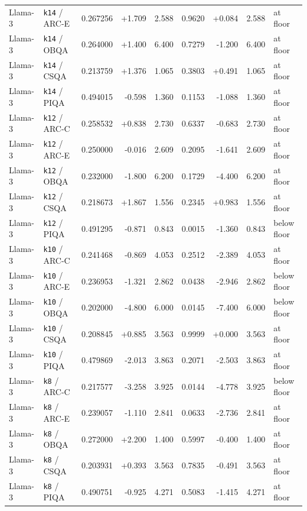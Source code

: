 {\begin{longtable}{@{}llrrrrrrl@{}}
Llama-3 & \texttt{k14} / ARC-E & 0.267256 & +1.709 & 2.588 & 0.9620 & +0.084 & 2.588 & at floor \\
Llama-3 & \texttt{k14} / OBQA & 0.264000 & +1.400 & 6.400 & 0.7279 & -1.200 & 6.400 & at floor \\
Llama-3 & \texttt{k14} / CSQA & 0.213759 & +1.376 & 1.065 & 0.3803 & +0.491 & 1.065 & at floor \\
Llama-3 & \texttt{k14} / PIQA & 0.494015 & -0.598 & 1.360 & 0.1153 & -1.088 & 1.360 & at floor \\
\midrule
Llama-3 & \texttt{k12} / ARC-C & 0.258532 & +0.838 & 2.730 & 0.6337 & -0.683 & 2.730 & at floor \\
Llama-3 & \texttt{k12} / ARC-E & 0.250000 & -0.016 & 2.609 & 0.2095 & -1.641 & 2.609 & at floor \\
Llama-3 & \texttt{k12} / OBQA & 0.232000 & -1.800 & 6.200 & 0.1729 & -4.400 & 6.200 & at floor \\
Llama-3 & \texttt{k12} / CSQA & 0.218673 & +1.867 & 1.556 & 0.2345 & +0.983 & 1.556 & at floor \\
Llama-3 & \texttt{k12} / PIQA & 0.491295 & -0.871 & 0.843 & 0.0015 & -1.360 & 0.843 & below floor \\
\midrule
Llama-3 & \texttt{k10} / ARC-C & 0.241468 & -0.869 & 4.053 & 0.2512 & -2.389 & 4.053 & at floor \\
Llama-3 & \texttt{k10} / ARC-E & 0.236953 & -1.321 & 2.862 & 0.0438 & -2.946 & 2.862 & below floor \\
Llama-3 & \texttt{k10} / OBQA & 0.202000 & -4.800 & 6.000 & 0.0145 & -7.400 & 6.000 & below floor \\
Llama-3 & \texttt{k10} / CSQA & 0.208845 & +0.885 & 3.563 & 0.9999 & +0.000 & 3.563 & at floor \\
Llama-3 & \texttt{k10} / PIQA & 0.479869 & -2.013 & 3.863 & 0.2071 & -2.503 & 3.863 & at floor \\
\midrule
Llama-3 & \texttt{k8} / ARC-C & 0.217577 & -3.258 & 3.925 & 0.0144 & -4.778 & 3.925 & below floor \\
Llama-3 & \texttt{k8} / ARC-E & 0.239057 & -1.110 & 2.841 & 0.0633 & -2.736 & 2.841 & at floor \\
Llama-3 & \texttt{k8} / OBQA & 0.272000 & +2.200 & 1.400 & 0.5997 & -0.400 & 1.400 & at floor \\
Llama-3 & \texttt{k8} / CSQA & 0.203931 & +0.393 & 3.563 & 0.7835 & -0.491 & 3.563 & at floor \\
Llama-3 & \texttt{k8} / PIQA & 0.490751 & -0.925 & 4.271 & 0.5083 & -1.415 & 4.271 & at floor \\

\end{longtable}}
